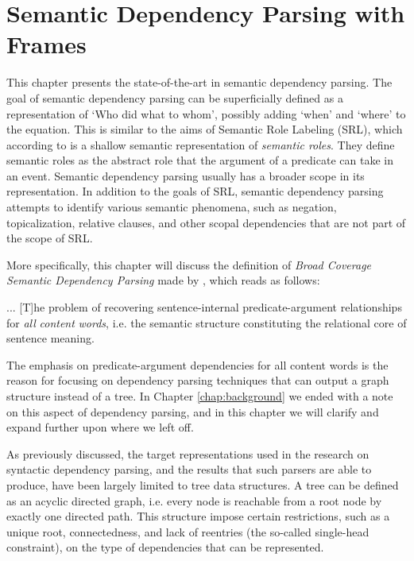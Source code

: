 \chapter{Semantic Dependency Parsing with Frames}
\label{chap:semantic}

This chapter presents the state-of-the-art in semantic dependency parsing. The goal of semantic dependency parsing can be superficially defined as a representation of `Who did what to whom', possibly adding `when' and `where' to the equation. This is similar to the aims of Semantic Role Labeling (SRL), which according to  is a shallow semantic representation of \textit{semantic roles}. They define semantic roles as the abstract role that the argument of a predicate can take in an event. Semantic dependency parsing usually has a broader scope in its representation. In addition to the goals of SRL, semantic dependency parsing attempts to identify various semantic phenomena, such as negation, topicalization, relative clauses, and other scopal dependencies that are not part of the scope of SRL.

More specifically, this chapter will discuss the definition of \textit{Broad Coverage Semantic Dependency Parsing} made by , which reads as follows:

\begin{displayquote}
... [T]he problem of recovering sentence-internal predicate-argument relationships for \textit{all} \textit{content} \textit{words}, i.e. the semantic structure constituting the relational core of sentence meaning.
\end{displayquote}

The emphasis on predicate-argument dependencies for all content words is the reason for focusing on dependency parsing techniques that can output a graph structure instead of a tree. In Chapter \ref{chap:background} we ended with a note on this aspect of dependency parsing, and in this chapter we will clarify and expand further upon where we left off.

As previously discussed, the target representations used in the research on syntactic dependency parsing, and the results that such parsers are able to produce, have been largely limited to tree data structures. A tree can be defined as an acyclic directed graph, i.e. every node is reachable from a root node by exactly one directed path. This structure impose certain restrictions, such as a unique root, connectedness, and lack of reentries (the so-called single-head constraint), on the type of dependencies that can be represented.

